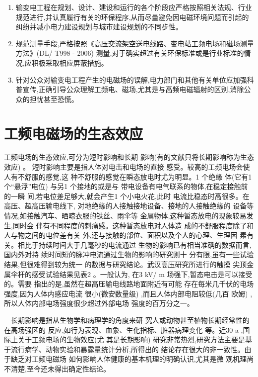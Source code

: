 \documentclass{ctexart} %
\begin{document}
\begin{enumerate}

\item  输变电工程在规划、设计、建设和运行的各个阶段应严格按照相关法规、行业规范进行,并认真履行有关的环保程序,从而尽量避免因电磁环境问题而引起的纠纷并减小电力建设规划与城市建设规划的不同步性。
\item 规范测量手段,严格按照《高压交流架空送电线路、变电站工频电场和磁场测量方法》(DL/ T998 - 2006) 测量,对于确实超过有关环保标准或是行业标准的情况,应积极采取相应屏蔽措施。
\item 针对公众对输变电工程产生的电磁场的误解,电力部门和其他有关单位应加强科普宣传,正确引导公众理解工频电、磁场,尤其是与高频电磁辐射的区别,消除公众的担忧甚至恐慌。

\end{enumerate}

\section{工频电磁场的生态效应}

工频电场的生态效应,可分为短时影响和长期
影响(有的文献只将长期影响称为生态效应) 。
短时影响主要是指人体对电击和电场的直接
感受。较高的工频电场会使人有不舒服的感觉,这
种不舒服的感觉在瞬态放电时尤为明显。1 个绝缘
体(它有1 个“悬浮”电位) 与另1 个接地的或是与
带电设备有电气联系的物体,在稳定接触前的一瞬
间,若电位差足够大,就会产生1 个小电火花,此时
电流比稳态时高很多。在高压、超高压输电线下,
对地绝缘的人接触接地设备、接地的人接触绝缘的
设备等情况,如接触汽车、晒晾衣服的铁丝、雨伞等
金属物体,这种暂态放电的现象较易发生,同时会
伴有不同程度的刺痛感。这种暂态放电对人体造
成的不舒服程度除了和人与物之间的电位差有关
外,还与接触的部位、面积以及个人的心理、生理因
素有关。相比于持续时间大于几毫秒的电流通过
生物的影响已有相当准确的数据而言,国内外对持
续时间短的脉冲电流通过生物的影响的研究则十
分有限,虽有一些试验结果,但很难得到较为统一
的数据与研究结论。武汉高压研究所进行的触摸
尖顶金属伞杆的感受试验结果见表2 。一般认为,
在3 kV/ m 场强下,暂态电击是可以接受的。需要
指出的是,虽然在超高压输电线路地面附近有可能
存在每米几千伏的电场强度,因为人体内感应电流
很小(微安数量级) ,而且人体内部电阻较低(几百
欧姆) ,所以人体内部电场强度很少超过外部电场
强度的百万分之一。

　长期影响是指从生物学和病理学的角度来研
究人或动物甚至植物长期经常性的在高场强区的
反应,如行为表现、血象、生化指标、脏器病理变化
等。近30 a ,国际上关于工频电场的生物效应(尤
其是长期影响) 研究非常热烈,研究方法主要是基
于流行病学、动物实验和暴露量统计分析,所得出的
结论存在很大的非一致性。由于缺乏对工频电磁场
如何影响人体健康的基本机理的明确认识,尤其是微
观机理尚不清楚,至今还未得出确定性结论。
\end{document}
